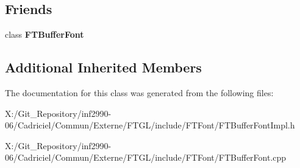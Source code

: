\subsection*{Friends}
\begin{DoxyCompactItemize}
\item 
\hypertarget{class_f_t_buffer_font_impl_ab7dc21f40be33fee50c41b3ba3d49c73}{class {\bfseries F\-T\-Buffer\-Font}}\label{class_f_t_buffer_font_impl_ab7dc21f40be33fee50c41b3ba3d49c73}

\end{DoxyCompactItemize}
\subsection*{Additional Inherited Members}


The documentation for this class was generated from the following files\-:\begin{DoxyCompactItemize}
\item 
X\-:/\-Git\-\_\-\-Repository/inf2990-\/06/\-Cadriciel/\-Commun/\-Externe/\-F\-T\-G\-L/include/\-F\-T\-Font/F\-T\-Buffer\-Font\-Impl.\-h\item 
X\-:/\-Git\-\_\-\-Repository/inf2990-\/06/\-Cadriciel/\-Commun/\-Externe/\-F\-T\-G\-L/include/\-F\-T\-Font/F\-T\-Buffer\-Font.\-cpp\end{DoxyCompactItemize}
